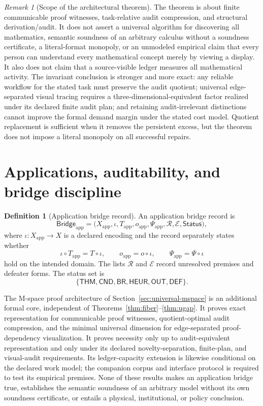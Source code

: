 \documentclass[11pt]{article}
\theoremstyle{plain}
\theoremstyle{definition}
\newtheorem{definition}[theorem]{Definition}
\theoremstyle{remark}
\newtheorem{remark}[theorem]{Remark}
\begin{document}
\begin{remark}[Scope of the architectural theorem]
\label{rem:scope-v9}
The theorem is about finite communicable proof witnesses, task-relative audit
compression, and structural derivation/audit.  It does not assert a universal
algorithm for discovering all mathematics, semantic soundness of an arbitrary
calculus without a soundness certificate, a literal-format monopoly, or an
unmodeled empirical claim that every person can understand every mathematical
concept merely by viewing a display.  It also does not claim that a source-visible
ledger measures all mathematical activity.  The invariant conclusion is stronger
and more exact: any reliable workflow for the stated task must preserve the audit
quotient; universal edge-separated visual tracing requires a
three-dimensional-equivalent factor realized under its declared finite audit
plan; and retaining audit-irrelevant distinctions cannot improve the formal
demand margin under the stated cost model.  Quotient replacement is sufficient
when it removes the persistent excess, but the theorem does not impose a literal
monopoly on all successful repairs.
\end{remark}

\section{Applications, auditability, and bridge discipline}
\label{sec:bridge}

\begin{definition}[Application bridge record]
An application bridge record is
\[
\mathsf{Bridge}_{\mathrm{app}}=
\bigl(X_{\mathrm{app}},\iota,T_{\mathrm{app}},o_{\mathrm{app}},
\Psi_{\mathrm{app}},\mathcal R,\mathcal E,\mathsf{Status}\bigr),
\]
where $\iota:X_{\mathrm{app}}\to X$ is a declared encoding and the record
separately states whether
\[
\iota\circ T_{\mathrm{app}}=T\circ\iota,\qquad
o_{\mathrm{app}}=o\circ\iota,\qquad
\Psi_{\mathrm{app}}=\Psi\circ\iota
\]
hold on the intended domain.  The lists $\mathcal R$ and $\mathcal E$ record
unresolved premises and defeater forms.  The status set is
\[
\{\mathsf{THM},\mathsf{CND},\mathsf{BR},\mathsf{HEUR},\mathsf{OUT},\mathsf{DEF}\}.
\]
\end{definition}

The M-space proof architecture of Section~\ref{sec:universal-mspace} is an
additional formal core, independent of Theorems~\ref{thm:fiber}--\ref{thm:ugap}.
It proves exact representation for communicable proof witnesses, quotient-optimal
audit compression, and the minimal universal dimension for edge-separated
proof-dependency visualization.  It proves necessity only up to
audit-equivalent representation and only under its declared novelty-separation,
finite-plan, and visual-audit requirements.  Its ledger-capacity extension is
likewise conditional on the declared work model; the companion corpus and
interface protocol is required to test its empirical premises.  None of these results makes
an application bridge true, establishes the semantic soundness of an arbitrary
model without its own soundness certificate, or entails a physical,
institutional, or policy conclusion.
\end{document}
